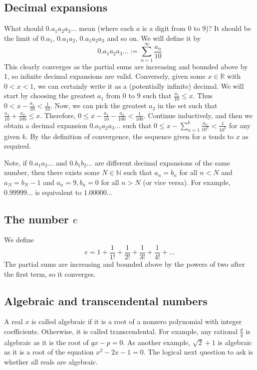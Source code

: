 \subsection{Decimal expansions}
What should \(0.a_1a_2a_3\dots\) mean (where each \(a\) is a digit from 0 to 9)?
It should be the limit of \(0.a_1\), \(0.a_1a_2\), \(0.a_1a_2a_3\) and so on.
We will define it by
\[
	0.a_1a_2a_3\dots := \sum_{n=1}^\infty \frac{a_n}{10}
\]
This clearly converges as the partial sums are increasing and bounded above by 1, so infinite decimal expansions are valid.
Conversely, given some \(x \in \mathbb R\) with \(0 < x < 1\), we can certainly write it as a (potentially infinite) decimal.
We will start by choosing the greatest \(a_1\) from 0 to 9 such that \(\frac{a_1}{10} \leq x\).
Thus \(0 < x - \frac{a_1}{10} < \frac{1}{10}\).
Now, we can pick the greatest \(a_2\) in the set such that \(\frac{a_1}{10} + \frac{a_2}{100} \leq x\).
Therefore, \(0 \leq x - \frac{a_1}{10} - \frac{a_2}{100} < \frac{1}{100}\).
Continue inductively, and then we obtain a decimal expansion \(0.a_1a_2a_3\dots\) such that \(0 \leq x - \sum_{n=1}^k \frac{a_n}{10^n} < \frac{1}{10^k}\) for any given \(k\).
By the definition of convergence, the sequence given for \(a\) tends to \(x\) as required.

Note, if \(0.a_1a_2\dots\) and \(0.b_1b_2\dots\) are different decimal expansions of the same number, then there exists some \(N \in \mathbb N\) such that \(a_n = b_n\) for all \(n < N\) and \(a_N = b_N - 1\) and \(a_n = 9, b_n = 0\) for all \(n > N\) (or vice versa).
For example, \(0.99999\dots\) is equivalent to \(1.00000\dots\)

\subsection{The number \(e\)}
We define
\[
	e = 1 + \frac{1}{1!} + \frac{1}{2!} + \frac{1}{3!} + \frac{1}{4!} + \dots
\]
The partial sums are increasing and bounded above by the powers of two after the first term, so it converges.

\subsection{Algebraic and transcendental numbers}
A real \(x\) is called algebraic if it is a root of a nonzero polynomial with integer coefficients.
Otherwise, it is called transcendental.
For example, any rational \(\frac{p}{q}\) is algebraic as it is the root of \(qx-p=0\).
As another example, \(\sqrt 2 + 1\) is algebraic as it is a root of the equation \(x^2 - 2x - 1 = 0\).
The logical next question to ask is whether all reals are algebraic.

